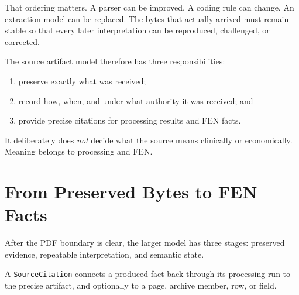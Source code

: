 \documentclass[11pt]{article}
\newcommand{\code}[1]{\texttt{#1}}
\begin{document}
That ordering matters. A parser can be improved. A coding rule can change. An extraction model can be replaced. The bytes that actually arrived must remain stable so that every later interpretation can be reproduced, challenged, or corrected.

The source artifact model therefore has three responsibilities:

\begin{enumerate}
  \item preserve exactly what was received;
  \item record how, when, and under what authority it was received; and
  \item provide precise citations for processing results and FEN facts.
\end{enumerate}

It deliberately does \emph{not} decide what the source means clinically or economically. Meaning belongs to processing and FEN.

\section{From Preserved Bytes to FEN Facts}

After the PDF boundary is clear, the larger model has three stages: preserved evidence, repeatable interpretation, and semantic state.

\begin{center}
\end{center}

A \code{SourceCitation} connects a produced fact back through its processing run to the precise artifact, and optionally to a page, archive member, row, or field.
\end{document}
